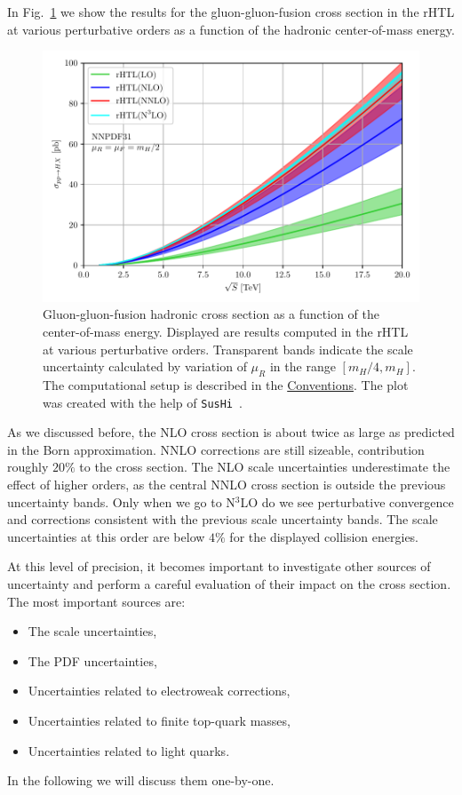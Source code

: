 In Fig.~\ref{fig:4:energy_scan_rHTL} we show the results for the gluon-gluon-fusion cross section in the \acs{rHTL} at various perturbative orders as a function of the hadronic center-of-mass energy.
\begin{figure}[ht]
\centering
\includegraphics[width=\figurewidth]{Images/energy_scan_HTL.pdf}
\caption{Gluon-gluon-fusion hadronic cross section as a function of the center-of-mass energy. Displayed are results computed in the \acs{rHTL} at various perturbative orders. Transparent bands indicate the scale uncertainty calculated by variation of $\mu_R$ in the range $[m_H/4, m_H]$. The computational setup is described in the \hyperref[chap:notation_and_conventions]{Conventions}. The plot was created with the help of \texttt{SusHi}~\cite{Harlander:2012pb, Harlander:2016hcx}.}
\label{fig:4:energy_scan_rHTL}
\end{figure}

As we discussed before, the \acs{NLO} cross section is about twice as large as predicted in the Born approximation. \acs{NNLO} corrections are still sizeable, contribution roughly $20\%$ to the cross section. The \acs{NLO} scale uncertainties underestimate the effect of higher orders, as the central \acs{NNLO} cross section is outside the previous uncertainty bands. Only when we go to N${}^3$LO do we see perturbative convergence and corrections consistent with the previous scale uncertainty bands. The scale uncertainties at this order are below $4\%$ for the displayed collision energies.

At this level of precision, it becomes important to investigate other sources of uncertainty and perform a careful evaluation of their impact on the cross section. The most important sources are:
\begin{itemize}
  \item The scale uncertainties,
  \item The \acs{PDF} uncertainties,
  \item Uncertainties related to electroweak corrections,
  \item Uncertainties related to finite top-quark masses,
  \item Uncertainties related to light quarks.
\end{itemize}
In the following we will discuss them one-by-one.


